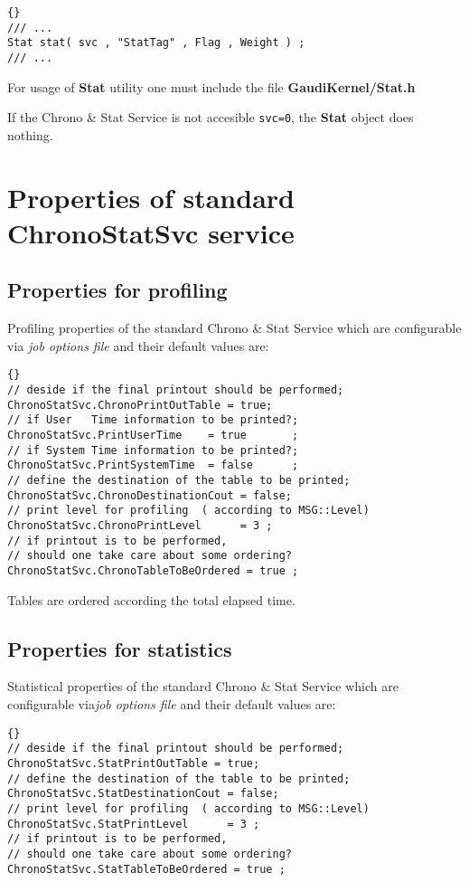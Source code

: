 \documentclass{lhcbnote}
\newcommand{\bftt}         {\ttfamily\bfseries}
\renewcommand{\it}         {\itshape}
\begin{document}
\begin{lstlisting}{}
/// ...
Stat stat( svc , "StatTag" , Flag , Weight ) ;
/// ...
\end{lstlisting}

For usage of {\bftt{Stat}} utility one must include the file
{\bftt{GaudiKernel/Stat.h}}

If the Chrono \& Stat Service  is not accesible \verb+svc=0+,
the {\bftt{Stat}} object does nothing.

\chapter{Properties of standard {\bftt{ChronoStatSvc}} service }

\section{Properties for profiling  }
Profiling properties of the standard Chrono \& Stat Service
which are configurable via {\it job options file} and their
default values are:

\begin{lstlisting}{}
// deside if the final printout should be performed;
ChronoStatSvc.ChronoPrintOutTable = true;
// if User   Time information to be printed?;
ChronoStatSvc.PrintUserTime    = true       ;
// if System Time information to be printed?;
ChronoStatSvc.PrintSystemTime  = false      ;
// define the destination of the table to be printed;
ChronoStatSvc.ChronoDestinationCout = false;
// print level for profiling  ( according to MSG::Level)
ChronoStatSvc.ChronoPrintLevel      = 3 ;
// if printout is to be performed,
// should one take care about some ordering?
ChronoStatSvc.ChronoTableToBeOrdered = true ;
\end{lstlisting}

Tables are ordered according the total elapsed time.

\section{Properties for statistics }
Statistical properties of the standard Chrono \& Stat Service
which are configurable via{\it job options file} and their default values
are:

\begin{lstlisting}{}
// deside if the final printout should be performed;
ChronoStatSvc.StatPrintOutTable = true;
// define the destination of the table to be printed;
ChronoStatSvc.StatDestinationCout = false;
// print level for profiling  ( according to MSG::Level)
ChronoStatSvc.StatPrintLevel      = 3 ;
// if printout is to be performed,
// should one take care about some ordering?
ChronoStatSvc.StatTableToBeOrdered = true ;
\end{lstlisting}
\end{document}
